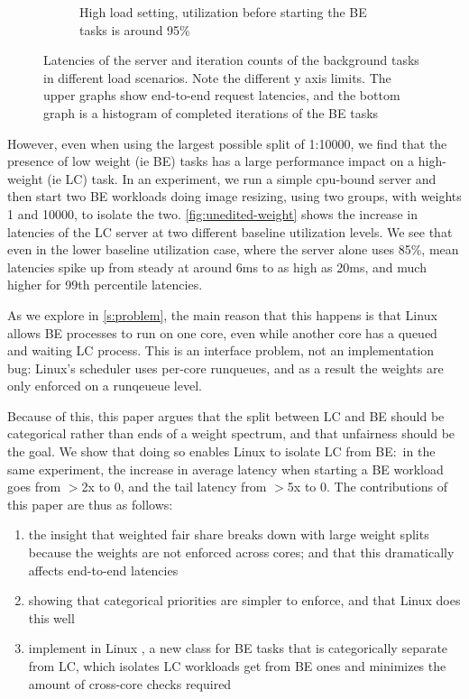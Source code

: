 \begin{figure}[t]
\begin{subfigure}[b]{0.49\columnwidth}
        \caption{High load setting, utilization before starting the BE tasks is
        around 95\%}\label{fig:unedited-weight-high-two}
    \end{subfigure}
    \vspace{4pt}
    \caption{Latencies of the server and iteration counts of the background
    tasks in different load scenarios. Note the different y axis limits. The
    upper graphs show end-to-end request latencies, and the bottom graph is a
    histogram of completed iterations of the BE tasks}\label{fig:unedited-weight}
\end{figure}

However, even when using the largest possible split of 1:10000, we find that the
presence of low weight (ie BE) tasks has a large performance impact on a
high-weight (ie LC) task. In an experiment, we run a simple cpu-bound server and
then start two BE workloads doing image resizing, using two \cgroups{} groups,
with weights 1 and 10000, to isolate the two. \autoref{fig:unedited-weight}
shows the increase in latencies of the LC server at two different baseline
utilization levels. We see that even in the lower baseline utilization case,
where the server alone uses 85\%, mean latencies spike up from steady at around
6ms to as high as 20ms, and much higher for 99th percentile latencies.

As we explore in \autoref{s:problem}, the main reason that this happens is that
Linux allows BE processes to run on one core, even while another core has a
queued and waiting LC process. This is an interface problem, not an
implementation bug: Linux's scheduler uses per-core runqueues, and as a result
the weights are only enforced on a runqeueue level.

Because of this, this paper argues that the split between LC and BE should be
categorical rather than ends of a weight spectrum, and that unfairness should be
the goal. We show that doing so enables Linux to isolate LC from BE:\ in the
same experiment, the increase in average latency when starting a BE workload
goes from $>$2x to 0, and the tail latency from $>$5x to 0. The contributions of
this paper are thus as follows: 
\begin{enumerate}
    \item the insight that weighted fair share breaks down with large weight
    splits because the weights are not enforced across cores; and that this
    dramatically affects end-to-end latencies
    \item showing that categorical priorities are simpler to enforce, and that
    Linux does this well
    \item implement in Linux \schedbe{}, a new class for BE tasks that is
    categorically separate from LC, which isolates LC workloads get from BE ones
    and minimizes the amount of cross-core checks required
\end{enumerate}
